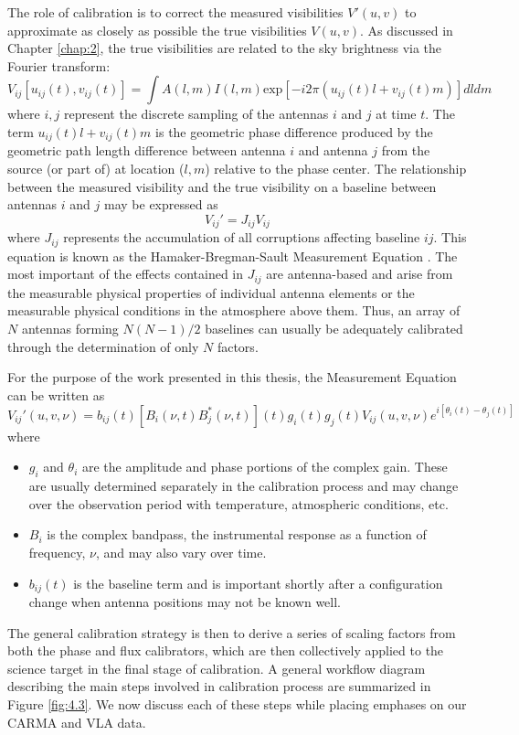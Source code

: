 The role of calibration is to correct the measured visibilities $V'(u,v)$ to approximate as closely as possible the true visibilities $V(u,v)$. As discussed in Chapter \ref{chap:2}, the true visibilities are related to the sky brightness via the Fourier transform:
\begin{equation}
V_{ij}[u_{ij}(t),v_{ij}(t)] = \int A(l,m) I(l,m) \mathrm{exp}[-i2\pi(u_{ij}(t)l + v_{ij}(t)m)]	dl	dm
\end{equation}
where $i,j$ represent the discrete sampling of the antennas $i$ and $j$ at time $t$. The term $u_{ij}(t)l + v_{ij}(t)m$ is the geometric phase difference produced by the geometric path length difference between antenna $i$ and antenna $j$ from the source (or part of) at location ($l,m$) relative to the phase center. The relationship between the measured visibility and the true visibility on a baseline between antennas $i$ and $j$ may be expressed as
\begin{equation}
V_{ij}' =  J_{ij}V_{ij}
\end{equation}
where $ J_{ij}$ represents the accumulation of all corruptions affecting baseline $ij$. This equation is known as the Hamaker-Bregman-Sault Measurement Equation \citep{hamaker_1996}. The most important of the effects contained in $J_{ij}$ are antenna-based and arise from the measurable physical properties of individual antenna elements or the measurable physical conditions in the atmosphere above them. Thus, an array of $N$ antennas forming $N(N-1)/2$ baselines can usually be adequately calibrated through the determination of only $N$ factors.

For the purpose of the work presented in this thesis, the Measurement Equation can be written as
\begin{equation}
V_{ij}'(u,v,\nu) = b_{ij}(t)[B_{i}(\nu ,t)B_{j}^{*}(\nu ,t)](t)g_{i}(t)g_{j}(t)V_{ij}(u,v,\nu)e^{i[\theta _{i}(t) - \theta _{j}(t)]}
\end{equation}
where
\begin{itemize}
\item $g_{i}$ and $\theta _{i}$ are the amplitude and phase portions of the complex gain. These are usually determined separately in the calibration process and may change over the observation period with temperature, atmospheric conditions, etc. 
\item $B_{i}$ is the complex bandpass, the instrumental response as a function of frequency, $\nu$, and may also vary over time.
\item $b_{ij}(t)$ is the baseline term and is important shortly after a configuration change when antenna positions may not be known well.
\end{itemize}
The general calibration strategy is then to derive a series of scaling factors from both the phase and flux calibrators, which are then collectively applied to the science target in the final stage of calibration. A general workflow diagram describing the main steps involved in calibration process are summarized in Figure \ref{fig:4.3}. We now discuss each of these steps while placing emphases on our CARMA and VLA data.


